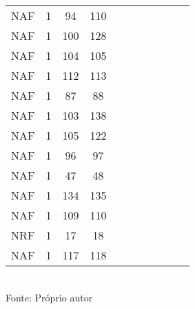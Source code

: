 \begin{table}[H]
{\begin{tabular}{ccccccccccc}
NAF & 1 & 94 & 110 &  &  &  &  &  &  &  \\
NAF & 1 & 100 & 128 &  &  &  &  &  &  &  \\
NAF & 1 & 104 & 105 &  &  &  &  &  &  &  \\
NAF & 1 & 112 & 113 &  &  &  &  &  &  &  \\
NAF & 1 & 87 & 88 &  &  &  &  &  &  &  \\
NAF & 1 & 103 & 138 &  &  &  &  &  &  &  \\
NAF & 1 & 105 & 122 &  &  &  &  &  &  &  \\
NAF & 1 & 96 & 97 &  &  &  &  &  &  &  \\
NAF & 1 & 47 & 48 &  &  &  &  &  &  &  \\
NAF & 1 & 134 & 135 &  &  &  &  &  &  &  \\
NAF & 1 & 109 & 110 &  &  &  &  &  &  &  \\
NRF & 1 & 17 & 18 &  &  &  &  &  &  &  \\
NAF & 1 & 117 & 118 &  &  &  &  &  &  &  \\
\bottomrule
\end{tabular}}
\\Fonte: Próprio autor
\end{table}


